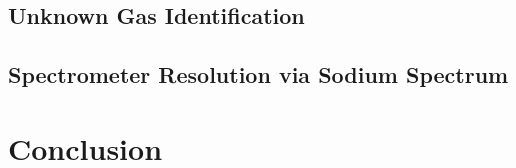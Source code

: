 \documentclass{article} %
\begin{document}
\begin{multicols}{2}
\subsection{Unknown Gas Identification}

\subsection{Spectrometer Resolution via Sodium Spectrum}

\section{Conclusion}

\label{last_page}

\newpage



\end{multicols}
\end{document}
